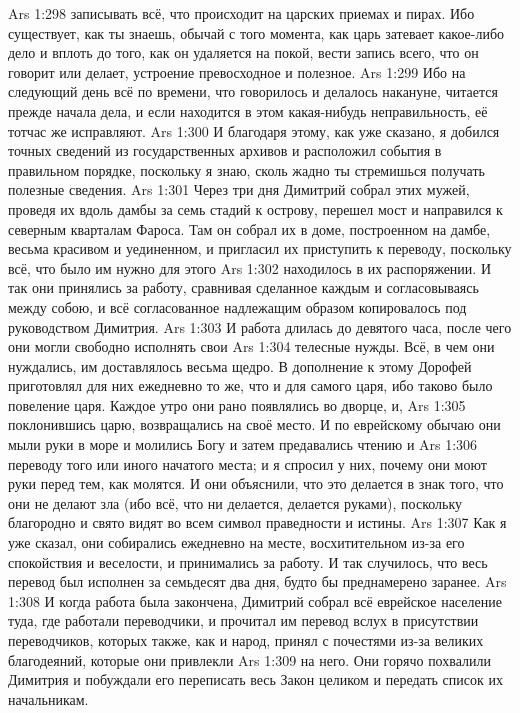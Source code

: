 \vs Ars 1:298
записывать всё, что происходит на царских приемах и пирах. Ибо существует, как ты знаешь, обычай с того момента, как царь затевает какое-либо дело и вплоть до того, как он удаляется на покой, вести запись всего, что он говорит или делает, устроение превосходное и полезное.
\vs Ars 1:299
Ибо на следующий день всё по времени, что говорилось и делалось накануне, читается прежде начала дела, и если находится в этом какая-нибудь неправильность, её тотчас же исправляют.
\vs Ars 1:300
И благодаря этому, как уже сказано, я добился точных сведений из государственных архивов и расположил события в правильном порядке, поскольку я знаю, сколь жадно ты стремишься получать полезные сведения.
\vs Ars 1:301
Через три дня Димитрий собрал этих мужей, проведя их вдоль дамбы за семь стадий к острову, перешел мост и направился к северным кварталам Фароса. Там он собрал их в доме, построенном на дамбе, весьма красивом и уединенном, и пригласил их приступить к переводу, поскольку всё, что было им нужно для этого
\vs Ars 1:302
находилось в их распоряжении. И так они принялись за работу, сравнивая сделанное каждым и согласовываясь между собою, и всё согласованное надлежащим образом копировалось под руководством Димитрия.
\vs Ars 1:303
И работа длилась до девятого часа, после чего они могли свободно исполнять свои
\vs Ars 1:304
телесные нужды. Всё, в чем они нуждались, им доставлялось весьма щедро. В дополнение к этому Дорофей приготовлял для них ежедневно то же, что и для самого царя, ибо таково было повеление царя. Каждое утро они рано появлялись во дворце, и,
\vs Ars 1:305
поклонившись царю, возвращались на своё место. И по еврейскому обычаю они мыли руки в море и молились Богу и затем предавались чтению и
\vs Ars 1:306
переводу того или иного начатого места; и я спросил у них, почему они моют руки перед тем, как молятся. И они объяснили, что это делается в знак того, что они не делают зла (ибо всё, что ни делается, делается руками), поскольку благородно и свято видят во всем символ праведности и истины.
\vs Ars 1:307
Как я уже сказал, они собирались ежедневно на месте, восхитительном из-за его спокойствия и веселости, и принимались за работу. И так случилось, что весь перевод был исполнен за семьдесят два дня, будто бы преднамерено заранее.
\vs Ars 1:308
И когда работа была закончена, Димитрий собрал всё еврейское население туда, где работали переводчики, и прочитал им перевод вслух в присутствии переводчиков, которых также, как и народ, принял с почестями из-за великих благодеяний, которые они привлекли
\vs Ars 1:309
на него. Они горячо похвалили Димитрия и побуждали его переписать весь Закон целиком и передать список их начальникам.

